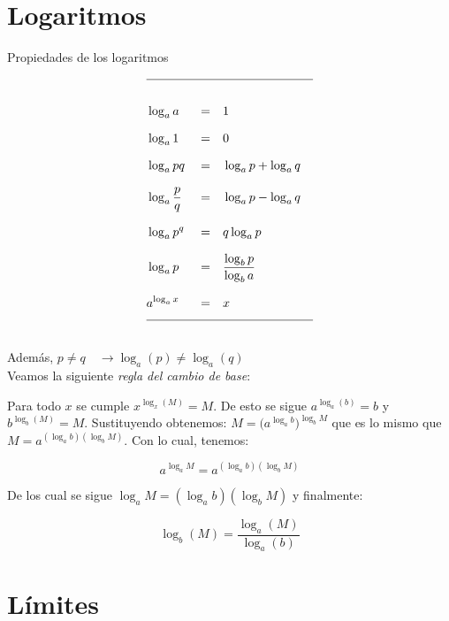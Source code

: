 \documentclass[12pt,a4paper]{extarticle}
\title{}
\begin{document}
\maketitle

\section{Logaritmos}
\begin{table}[!htbp]
\caption{Propiedades de los logaritmos}
\begin{align*}
\hline\\[0.5em]
&\log_a{a} &&=&& 1 &\\[0.7em]
&\log_a{1} &&=&& 0 &\\[0.7em]
&\log_a{pq} &&=&& \log_a{p} + \log_a{q}&\\[0.7em]
&\log_a{\frac{p}{q}} &&=&& \log_a{p} - \log_a{q} &\\[0.7em]
&\log_a{p^q} &&=&& q\log_a{p} &\\[0.7em]
&\log_a{p} &&=&& \frac{\log_b{p}}{\log_b{a}}&\\[0.7em]
&a^{\log_a{x}} &&=&& x&\\[0.7em]
\hline \\
\end{align*}
\label{tab:loga}
\end{table}

Adem\'as, \(p \neq q \quad \to  \log_a(p) \neq \log_a(q)\) \\

Veamos la siguiente \emph{regla del cambio de base}:

Para todo \( x \)  se cumple \( x^{\log_x(M)} = M \). De esto se sigue
\( a^{\log_a(b)} = b \) y \( b^{\log_b(M)} = M \). Sustituyendo
obtenemos: \(M= \big(a^{\log_a b}\big)^{\log_b M} \) que es lo mismo que
\(M= a^{(\log_a b)(\log_b M)}   \). Con lo cual, tenemos:


\[a^{\log_a M} = a^{(\log_a b)(\log_b M)} \]

De los cual se sigue \( \log_a M = (\log_a b)(\log_b M) \)  y
finalmente:

\begin{equation}
\log_b(M) = \frac{\log_a(M)}{\log_a(b)}
\end{equation}


\section{L\'imites}
\end{document}
